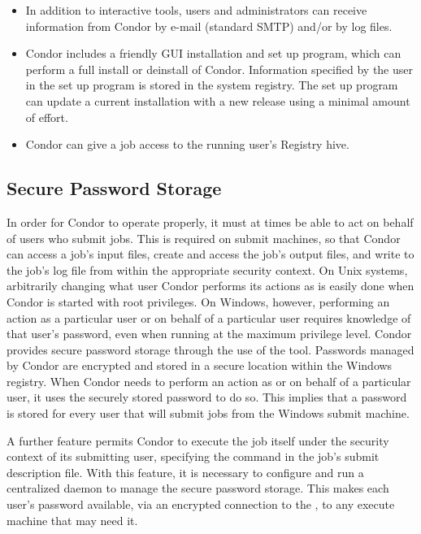 \begin{itemize}
\item In addition to interactive tools, users and administrators can receive
information from Condor by e-mail (standard SMTP) and/or by log files.

\item Condor includes a friendly GUI installation and set up program,
which can perform a full install or deinstall of Condor.
Information specified by the user in the set up program is stored in the
system registry.  
The set up program can update a current installation with a
new release using a minimal amount of effort.

\item Condor can give a job access to the running user's Registry hive.

\end{itemize}

\subsection{\label{sec:windows-sps}Secure Password Storage}

In order for Condor to operate properly, it must at times be able to
act on behalf of users who submit jobs.  
This is required on submit machines,
so that Condor can access a job's input files, 
create and access the job's output files, 
and write to the job's log file from within the appropriate security context.
On Unix systems, arbitrarily changing what user Condor performs its
actions as is easily done when Condor is started with root privileges.
On Windows, however, performing an action as a particular user
or on behalf of a particular user requires knowledge of that user's password,
even when running at the maximum privilege level.
Condor provides secure password storage through the use of the 
 tool.
Passwords managed by Condor are encrypted and stored 
in a secure location within the Windows registry.
When Condor needs to perform an action as or on behalf of a particular user,
it uses the securely stored password to do so.
This implies that a password is stored for every user that will
submit jobs from the Windows submit machine.

A further feature permits Condor to execute the job itself under the
security context of its submitting user, specifying 
the  command in the job's
submit description file. 
With this feature, 
it is necessary to configure and run a centralized  daemon
to manage the secure password storage.
This makes each user's password available, via an encrypted
connection to the , to any execute machine that may need it.

